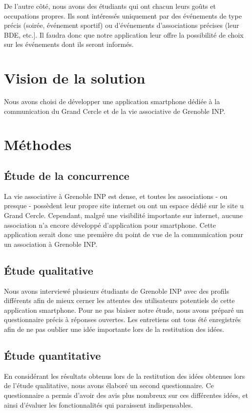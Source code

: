 \documentclass[a4paper, 11px]{article}
\begin{document}
De l'autre côté, nous avons des étudiants qui ont chacun leurs goûts et occupations propres. Ils sont intéressés uniquement par des événements de type précis (soirée, événement sportif) ou d'événements d'associations précises (leur BDE, etc.]. Il faudra donc que notre application leur offre la possibilité de choix sur les événements dont ils seront informés.


\newpage


\section{Vision de la solution}
Nous avons choisi de développer une application smartphone dédiée à la communication du Grand Cercle et de la vie associative de Grenoble INP.

\newpage

\section{Méthodes}

\subsection{Étude de la concurrence}
La vie associative à Grenoble INP est dense, et toutes les associations - ou presque - possèdent leur propre site internet ou ont un espace dédié sur le site u Grand Cercle.
Cependant, malgré une visibilité importante sur internet, aucune association n'a encore développé d'application pour smartphone. Cette application serait donc une première du point de vue de la communication pour un association à Grenoble INP.

\subsection{Étude qualitative}
Nous avons interviewé plusieurs étudiants de Grenoble INP avec des profils différents afin de mieux cerner les attentes des utilisateurs potentiels de cette application smartphone. Pour ne pas biaiser notre étude, nous avons préparé un questionnaire précis à réponses ouvertes.
Les entretiens ont tous été enregistrés afin de ne pas oublier une idée importante lors de la restitution des idées. 

\subsection{Étude quantitative}
En considérant les résultats obtenus lors de la restitution des idées obtenues lors de l'étude qualitative, nous avons élaboré un second questionnaire. Ce questionnaire a permis d'avoir des avis plus nombreux sur ces différentes idées, et ainsi d'évaluer les fonctionnalités qui paraissent indispensables.
\end{document}
